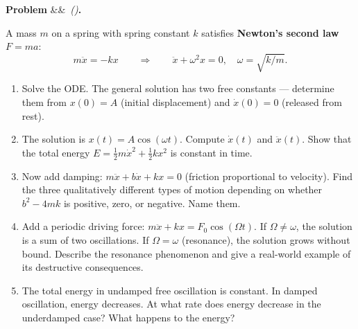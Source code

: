 \documentclass[12pt, a4paper]{article}
\newcounter{problem}
\newenvironment{problem}[1][]{%
  \refstepcounter{problem}%
  \par\vspace{6pt}%
  \noindent\textbf{\color{MidBlue}Problem \theproblem}%
  \ifx&#1&\else\ \textit{(#1)}\fi\textbf{.}\enskip
}{\par\vspace{4pt}}
\begin{document}
\begin{problem}
\label{prob:harmonic}
A mass $m$ on a spring with spring constant $k$ satisfies \textbf{Newton's second law} $F = ma$:
\[
  m\ddot{x} = -kx \qquad \Longrightarrow \qquad \ddot{x} + \omega^2 x = 0, \quad \omega = \sqrt{k/m}.
\]
\begin{enumerate}[label=(\alph*), topsep=2pt]
  \item Solve the ODE. The general solution has two free constants --- determine them from $x(0) = A$ (initial displacement) and $\dot{x}(0) = 0$ (released from rest).
  \item The solution is $x(t) = A\cos(\omega t)$. Compute $\dot{x}(t)$ and $\ddot{x}(t)$. Show that the total energy $E = \frac{1}{2}m\dot{x}^2 + \frac{1}{2}kx^2$ is constant in time.
  \item Now add damping: $m\ddot{x} + b\dot{x} + kx = 0$ (friction proportional to velocity). Find the three qualitatively different types of motion depending on whether $b^2 - 4mk$ is positive, zero, or negative. Name them.
  \item Add a periodic driving force: $m\ddot{x} + kx = F_0\cos(\Omega t)$. If $\Omega \neq \omega$, the solution is a sum of two oscillations. If $\Omega = \omega$ (resonance), the solution grows without bound. Describe the resonance phenomenon and give a real-world example of its destructive consequences.
  \item The total energy in undamped free oscillation is constant. In damped oscillation, energy decreases. At what rate does energy decrease in the underdamped case? What happens to the energy?
\end{enumerate}
\end{problem}

\begin{center}
\end{center}
\end{document}
